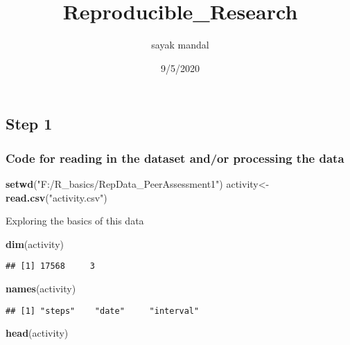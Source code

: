 \documentclass[
]{article}
\title{Reproducible\_Research}
\author{sayak mandal}
\date{9/5/2020}
\newenvironment{Shaded}{\begin{snugshade}}{\end{snugshade}}
\newcommand{\KeywordTok}[1]{\textcolor[rgb]{0.13,0.29,0.53}{\textbf{#1}}}
\newcommand{\NormalTok}[1]{#1}
\newcommand{\StringTok}[1]{\textcolor[rgb]{0.31,0.60,0.02}{#1}}
\begin{document}
\maketitle

\hypertarget{step-1}{%
\subsection{Step 1}\label{step-1}}

\hypertarget{code-for-reading-in-the-dataset-andor-processing-the-data}{%
\subsubsection{Code for reading in the dataset and/or processing the
data}\label{code-for-reading-in-the-dataset-andor-processing-the-data}}

\begin{Shaded}
\begin{Highlighting}[]
\KeywordTok{setwd}\NormalTok{(}\StringTok{"F:/R_basics/RepData_PeerAssessment1"}\NormalTok{)}
\NormalTok{activity<-}\KeywordTok{read.csv}\NormalTok{(}\StringTok{"activity.csv"}\NormalTok{)}
\end{Highlighting}
\end{Shaded}

Exploring the basics of this data

\begin{Shaded}
\begin{Highlighting}[]
\KeywordTok{dim}\NormalTok{(activity)}
\end{Highlighting}
\end{Shaded}

\begin{verbatim}
## [1] 17568     3
\end{verbatim}

\begin{Shaded}
\begin{Highlighting}[]
\KeywordTok{names}\NormalTok{(activity)}
\end{Highlighting}
\end{Shaded}

\begin{verbatim}
## [1] "steps"    "date"     "interval"
\end{verbatim}

\begin{Shaded}
\begin{Highlighting}[]
\KeywordTok{head}\NormalTok{(activity)}
\end{Highlighting}
\end{Shaded}
\end{document}
